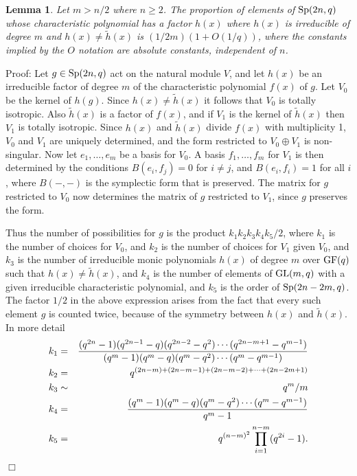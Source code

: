 \documentclass[12pt]{article}
\newtheorem{lemma}[definition]{Lemma}
\newenvironment{proof}{\normalsize {\sc Proof}:}{{\hfill $\Box$ \\}}
\def\GL{{\rm GL}}
\def\GF{{\rm GF}}
\def\Sp{{\rm Sp}}
\begin{document}
\begin{lemma}\label{Lemma5.8} Let $m>n/2$ where $n \geq 2$. 
The proportion of elements of
$\Sp(2n,q)$ whose characteristic polynomial has a factor $h(x)$ where
$h(x)$ is irreducible of degree $m$ and $h(x)\ne \tilde{h}(x)$ is
$(1/2m)(1+O(1/q))$, where the constants implied by the $O$ notation 
are absolute constants, independent of $n$.
\end{lemma}
\begin{proof}
Let $g\in\Sp(2n,q)$ act on the natural module $V$, and let
$h(x)$ be an irreducible factor of degree $m$
of the characteristic polynomial
$f(x)$ of $g$. 
Let $V_0$ be the kernel of $h(g)$. Since    
$h(x)\ne \tilde{h}(x)$ it follows that $V_0$ is totally isotropic. Also
$\tilde{h}(x)$ is a factor of $f(x)$, and if  $V_1$ is the kernel of
$\tilde{h}(x)$ then $V_1$ is totally isotropic. Since $h(x)$ and
$\tilde{h}(x)$ divide $f(x)$ with multiplicity 1, $V_0$ and $V_1$ are
uniquely determined, and the form restricted to $V_0\oplus V_1$ is
non-singular. Now let $e_1,\ldots,e_m$ be a basis for $V_0$. A basis
$f_1,\ldots,f_m$ for $V_1$ is then determined by the conditions
$B(e_i,f_j)=0$ for $i \ne j$, and $B(e_i,f_i)=1$ for all $i$, where
$B(-,-)$ is the symplectic form that is preserved. The matrix for $g$
restricted to $V_0$ now determines the matrix of $g$ restricted to
$V_1$, since $g$ preserves the form. 

Thus the number of possibilities
for $g$ is the product $k_1k_2k_3k_4k_5/2$, where $k_1$ is
the number of choices for $V_0$, and $k_2$ is the number of choices
for $V_1$ given $V_0$, and $k_3$ is the number of irreducible monic 
polynomials $h(x)$ of degree $m$ over $\GF(q)$ such that $h(x)\ne
\tilde{h}(x)$, and $k_4$ is the number of elements of $\GL(m,q)$ with a
given irreducible characteristic polynomial, and $k_5$ is the order of
$\Sp(2n-2m,q)$.   The factor $1/2$ in the above expression arises from
the fact that every such element $g$ is counted twice, because of the
symmetry between $h(x)$ and $\tilde h(x)$. 
In more detail 
\begin{eqnarray*}
k_1 & = & {(q^{2n}-1)(q^{2n-1}-q)(q^{2n-2}-q^2)\cdots(q^{2n-m+1}-q^{m-1})\over
(q^m-1)(q^m-q)(q^m-q^2)\cdots(q^m-q^{m-1})} \\                   
k_2 & = & q^{(2n-m)+(2n-m-1)+(2n-m-2)+\cdots+(2n-2m+1)} \\
k_3 & \sim  & q^m/m \\
k_4 & = & {(q^m-1)(q^m-q)(q^m-q^2)\cdots(q^m-q^{m-1})\over q^m-1}\\
k_5 & = & q^{(n-m)^2} \prod_{i = 1}^{n - m}(q^{2i}-1). 
\end{eqnarray*}


\end{proof}
\end{document}
